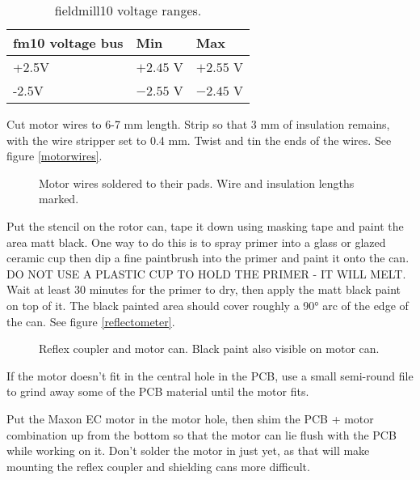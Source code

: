 \documentclass{article}
\begin{document}
\begin{table}[H]
\begin{centering}
\begin{tabular}{|l|l|l|}
\hline
{\bf fm10 voltage bus} & {\bf Min}    & {\bf Max} \\ \hline
+2.5V                  & $+2.45$ V    & $+2.55$ V \\ \hline
-2.5V                  & $-2.55$ V    & $-2.45$ V \\ \hline
\end{tabular}
\caption{fieldmill10 voltage ranges.}
\label{fm10_voltages}
\end{centering}
\end{table}

Cut motor wires to 6-7 mm length.
Strip so that 3 mm of insulation remains, with the wire stripper set to 0.4 mm.
Twist and tin the ends of the wires. See figure \vref{motorwires}.

\begin{figure}
\centering
\caption{Motor wires soldered to their pads. Wire and insulation lengths marked.}
\label{motorwires}
\end{figure}

Put the stencil on the rotor can, tape it down using masking tape and paint the area matt black.
One way to do this is to spray primer into a glass or glazed ceramic cup then dip a fine paintbrush into the primer and paint it onto the can.
DO NOT USE A PLASTIC CUP TO HOLD THE PRIMER - IT WILL MELT.
Wait at least 30 minutes for the primer to dry, then apply the matt black paint on top of it.
The black painted area should cover roughly a 90° arc of the edge of the can.
See figure \vref{reflectometer}.

\begin{figure}
\centering
\caption{Reflex coupler and motor can. Black paint also visible on motor can.}
\label{reflectometer}
\end{figure}

If the motor doesn't fit in the central hole in the PCB, use a small semi-round file
to grind away some of the PCB material until the motor fits.

Put the Maxon EC motor in the motor hole,
then shim the PCB + motor combination up from the bottom so that
the motor can lie flush with the PCB while working on it.
Don't solder the motor in just yet, as that will make mounting the reflex coupler and shielding cans more difficult.
\end{document}
